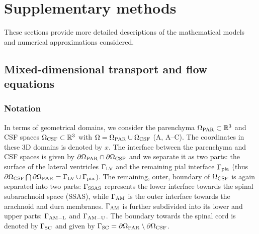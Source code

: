 \section{Supplementary methods}

These sections provide more detailed descriptions of the mathematical models and numerical approximations considered.

\subsection{Mixed-dimensional transport and flow equations}
\label{sec:app:more_maths}

\subsubsection{Notation}

In terms of geometrical domains, we consider the parenchyma
$\Omega_{\rm PAR} \subset \mathbb{R}^3$ and CSF spaces $\Omega_{\rm CSF}
\subset \mathbb{R}^3$ with $\Omega = \Omega_{\rm PAR} \cup \Omega_{\rm CSF}$
(A, A--C). The coordinates in these
3D domains is denoted by $x$. The interface between the parenchyma and
CSF spaces is given by $\partial \Omega_{\rm PAR} \cap \partial
\Omega_{\rm CSF}$ and we separate it as two parts: the surface of the
lateral ventricles $\Gamma_{\rm LV}$ and the remaining pial interface
$\Gamma_{\rm pia}$ (thus $\partial \Omega_{\rm CSF} \bigcap \partial
\Omega_{\rm PAR} = \Gamma_{\rm LV} \cup \Gamma_{\rm pia}$). The
remaining, outer, boundary of $\Omega_{\rm CSF}$ is again separated
into two parts: $\Gamma_{\rm SSAS}$ represents the lower interface
towards the spinal subarachnoid space (SSAS), while $\Gamma_{\rm AM}$
is the outer interface towards the arachnoid and dura
membranes. $\Gamma_{\rm AM}$ is further subdivided into its lower and
upper parts: $\Gamma_{\rm AM-L}$ and $\Gamma_{\rm AM-U}$. The boundary
towards the spinal cord is denoted by $\Gamma_{\rm{SC}}$ and given by
$\Gamma_{\rm{SC}} = \partial \Omega_{\rm PAR} \setminus \partial
\Omega_{\rm CSF}$.

